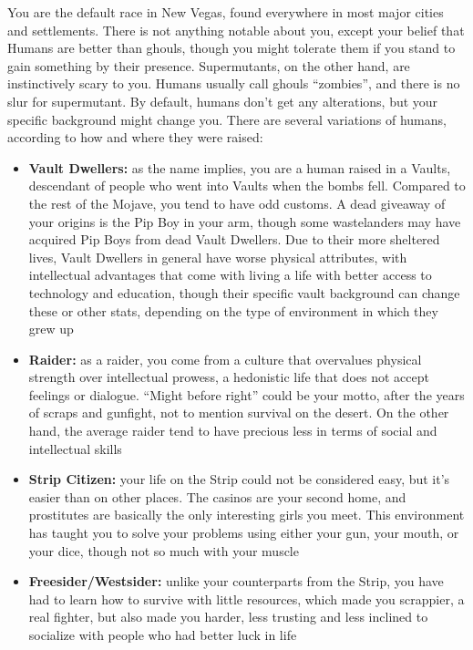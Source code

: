 \documentclass[11pt]{article} %
\begin{document}
You are the default race in New Vegas, found everywhere in most major cities and settlements. There is not anything notable about you, except your belief that Humans are better than ghouls, though you might tolerate them if you stand to gain something by their presence. Supermutants, on the other hand, are instinctively scary to you. Humans usually call ghouls ``zombies'', and there is no slur for supermutant. By default, humans don't get any alterations, but your specific background might change you. There are several variations of humans, according to how and where they were raised:

\begin{itemize}
	\item \textbf{Vault Dwellers:} as the name implies, you are a human raised in a Vaults, descendant of people who went into Vaults when the bombs fell. Compared to the rest of the Mojave, you tend to have odd customs. A dead giveaway of your origins is the Pip Boy in your arm, though some wastelanders may have acquired Pip Boys from dead Vault Dwellers. Due to their more sheltered lives, Vault Dwellers in general have worse physical attributes, with intellectual advantages that come with living a life with better access to technology and education, though their specific vault background can change these or other stats, depending on the type of environment in which they grew up 
	
	\item \textbf{Raider:} as a raider, you come from a culture that overvalues physical strength over intellectual prowess, a hedonistic life that does not accept feelings or dialogue. ``Might before right'' could be your motto, after the years of scraps and gunfight, not to mention survival on the desert. On the other hand, the average raider tend to have precious less in terms of social and intellectual skills
	
	\item \textbf{Strip Citizen:} your life on the Strip could not be considered easy, but it's easier than on other places. The casinos are your second home, and prostitutes are basically the only interesting girls you meet. This environment has taught you to solve your problems using either your gun, your mouth, or your dice, though not so much with your muscle
	
	\item \textbf{Freesider/Westsider:} unlike your counterparts from the Strip, you have had to learn how to survive with little resources, which made you scrappier, a real fighter, but also made you harder, less trusting and less inclined to socialize with people who had better luck in life
	

\end{itemize}
\end{document}
